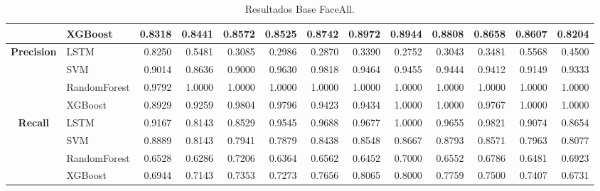 \begin{table}[h]
\begin{adjustbox}{max width=15cm}
\begin{tabular}{|c|l|r|r|r|r|r|r|r|r|r|r|r|}
			& XGBoost &  0.8318 &  0.8441 &  0.8572 &  0.8525 &  0.8742 &  0.8972 &  0.8944 &  0.8808 &  0.8658 &  0.8607 &  0.8204 \\
			\hline
			\textbf{Precision} & LSTM &  0.8250 &  0.5481 &  0.3085 &  0.2986 &  0.2870 &  0.3390 &  0.2752 &  0.3043 &  0.3481 &  0.5568 &  0.4500 \\
			& SVM &  0.9014 &  0.8636 &  0.9000 &  0.9630 &  0.9818 &  0.9464 &  0.9455 &  0.9444 &  0.9412 &  0.9149 &  0.9333 \\
			& RandomForest &  0.9792 &  1.0000 &  1.0000 &  1.0000 &  1.0000 &  1.0000 &  1.0000 &  1.0000 &  1.0000 &  1.0000 &  1.0000 \\
			& XGBoost &  0.8929 &  0.9259 &  0.9804 &  0.9796 &  0.9423 &  0.9434 &  1.0000 &  1.0000 &  0.9767 &  1.0000 &  1.0000 \\
			\hline
			\textbf{Recall} & LSTM &  0.9167 &  0.8143 &  0.8529 &  0.9545 &  0.9688 &  0.9677 &  1.0000 &  0.9655 &  0.9821 &  0.9074 &  0.8654 \\
			& SVM &  0.8889 &  0.8143 &  0.7941 &  0.7879 &  0.8438 &  0.8548 &  0.8667 &  0.8793 &  0.8571 &  0.7963 &  0.8077 \\
			& RandomForest &  0.6528 &  0.6286 &  0.7206 &  0.6364 &  0.6562 &  0.6452 &  0.7000 &  0.6552 &  0.6786 &  0.6481 &  0.6923 \\
			& XGBoost &  0.6944 &  0.7143 &  0.7353 &  0.7273 &  0.7656 &  0.8065 &  0.8000 &  0.7759 &  0.7500 &  0.7407 &  0.6731 \\
			\hline
		\end{tabular}
	\end{adjustbox}
	\label{tab:FaceAllBase}
	\caption{Resultados Base FaceAll.}
\end{table}

